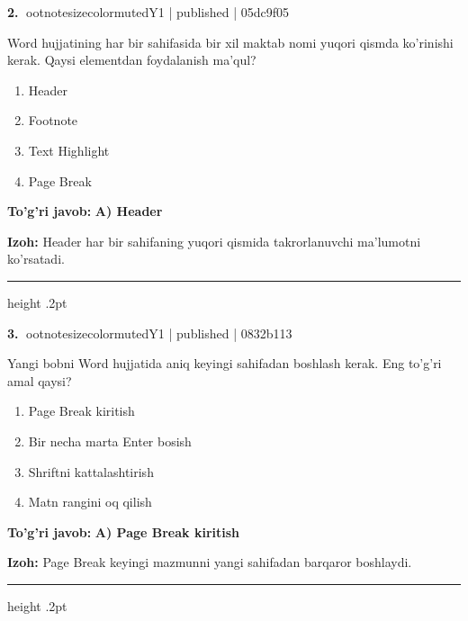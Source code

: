 \documentclass[10pt,a4paper]{article}
\begin{document}
\textbf{\color{ink}2.} {ootnotesizecolor{muted}Y1 | published | 05dc9f05}
\par
Word hujjatining har bir sahifasida bir xil maktab nomi yuqori qismda ko'rinishi kerak. Qaysi elementdan foydalanish ma'qul?
\begin{enumerate}[label=\Alph*),leftmargin=9mm]
\item Header
\item Footnote
\item Text Highlight
\item Page Break
\end{enumerate}
\begin{tcolorbox}[enhanced,breakable,colback=teal!4,colframe=teal!55!black,boxrule=0.45pt,arc=1.2mm,left=2.8mm,right=2.8mm,top=2mm,bottom=2mm]
\textbf{\color{teal}To'g'ri javob:} \textbf{A) Header}
\par\smallskip
\textbf{Izoh:} Header har bir sahifaning yuqori qismida takrorlanuvchi ma'lumotni ko'rsatadi.
\end{tcolorbox}
\vspace{2mm}\hrule height .2pt\vspace{2mm}

\textbf{\color{ink}3.} {ootnotesizecolor{muted}Y1 | published | 0832b113}
\par
Yangi bobni Word hujjatida aniq keyingi sahifadan boshlash kerak. Eng to'g'ri amal qaysi?
\begin{enumerate}[label=\Alph*),leftmargin=9mm]
\item Page Break kiritish
\item Bir necha marta Enter bosish
\item Shriftni kattalashtirish
\item Matn rangini oq qilish
\end{enumerate}
\begin{tcolorbox}[enhanced,breakable,colback=teal!4,colframe=teal!55!black,boxrule=0.45pt,arc=1.2mm,left=2.8mm,right=2.8mm,top=2mm,bottom=2mm]
\textbf{\color{teal}To'g'ri javob:} \textbf{A) Page Break kiritish}
\par\smallskip
\textbf{Izoh:} Page Break keyingi mazmunni yangi sahifadan barqaror boshlaydi.
\end{tcolorbox}
\vspace{2mm}\hrule height .2pt\vspace{2mm}
\end{document}
